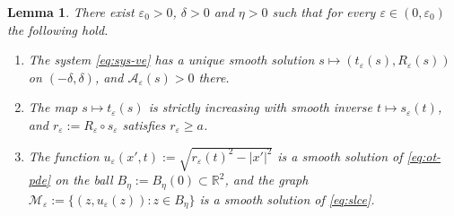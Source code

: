 \documentclass[12pt,letterpaper]{amsart}
\theoremstyle{definition}
\theoremstyle{plain}
\newtheorem{lemma}[definition]{Lemma}
\numberwithin{equation}{section}
\newcommand{\R}{\mathbb{R}}
\newcommand{\ve}{\varepsilon}
\begin{document}
\begin{lemma}\label{lem:perturbed}
    There exist $\varepsilon_0>0$, $\delta>0$ and $\eta>0$ such that for every
    $\varepsilon\in(0,\varepsilon_0)$ the following hold.
    \begin{enumerate}
        \item[\rm(i)] The system \eqref{eq:sys-ve} has a unique smooth solution
        $s\mapsto(t_\ve(s),R_\ve(s))$ on $(-\delta,\delta)$, and $\mathcal{A}_\ve(s)>0$ there.
        \item[\rm(ii)] The map $s\mapsto t_\ve(s)$ is strictly increasing with smooth inverse
        $t\mapsto s_\ve(t)$, and $r_\ve:=R_\ve\circ s_\ve$ satisfies $r_\ve\geq a$.
        \item[\rm(iii)] The function $u_\ve(x',t):=\sqrt{r_\ve(t)^2-|x'|^2}$ is a smooth solution
        of \eqref{eq:ot-pde} on the ball $B_\eta:=B_\eta(0)\subset\R^2$, and the graph
        $\mathcal{M}_\ve:=\{(z,u_\ve(z)):z\in B_\eta\}$ is a smooth solution of \eqref{eq:slce}.
    \end{enumerate}
\end{lemma}
\end{document}
